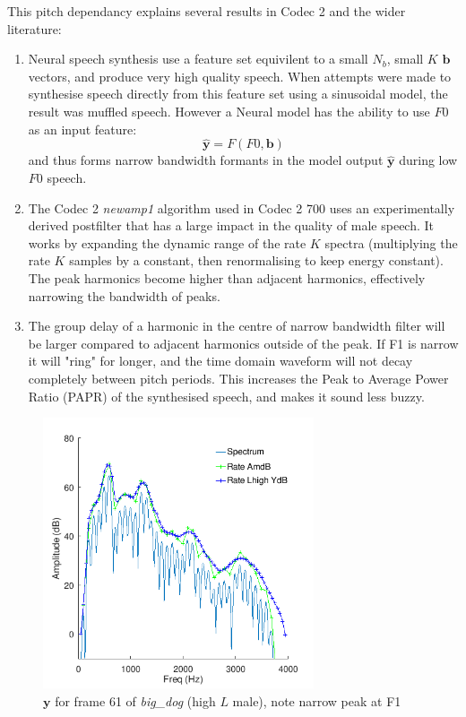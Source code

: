 \documentclass{article}
\begin{document}
This pitch dependancy explains several results in Codec 2 and the wider literature:
\begin{enumerate}
\item Neural speech synthesis use a feature set equivilent to a small $N_b$, small $K$ $\mathbf{b}$ vectors, and produce very high quality speech.  When attempts were made to synthesise speech directly from this feature set using a sinusoidal model, the result was muffled speech. However a Neural model has the ability to use $F0$ as an input feature:
\begin{equation}
\hat{\mathbf{y}} = F(F0, \mathbf{b}) 
\end{equation}
and thus forms narrow bandwidth formants in the model output $\hat{\mathbf{y}}$ during low $F0$ speech.

\item The Codec 2 \emph{newamp1} algorithm used in Codec 2 700 uses an experimentally derived postfilter that has a large impact in the quality of male speech.  It works by expanding the dynamic range of the rate $K$ spectra (multiplying the rate $K$ samples by a constant, then renormalising to keep energy constant).  The peak harmonics become higher than adjacent harmonics, effectively narrowing the bandwidth of peaks.

\item The group delay of a harmonic in the centre of narrow bandwidth filter will be larger compared to adjacent harmonics outside of the peak.  If F1 is narrow it will "ring" for longer, and the time domain waveform will not decay completely between pitch periods.  This increases the Peak to Average Power Ratio (PAPR) of the synthesised speech, and makes it sound less buzzy.

\end{enumerate}

\begin{figure}[h]
\caption{$\mathbf{y}$ for frame 61 of \emph{big\_dog} (high $L$ male), note narrow peak at F1 }
\label{fig:ratek7_big_dog_61}
\begin{center}
\includegraphics[width=8cm]{ratek7_big_dog_61.png}
\end{center}
\end{figure}
\end{document}
